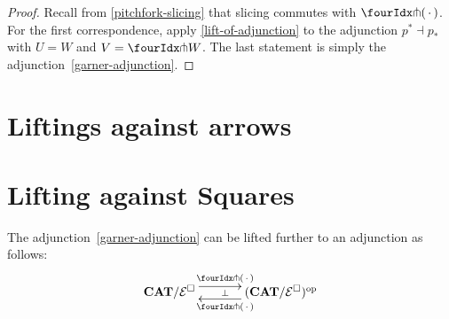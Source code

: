 \documentclass[reqno,10pt,a4paper,oneside]{amsart}
\begin{document}
\begin{proof}
Recall from \cref{pitchfork-slicing} that slicing commutes with $\liftr{\brarghole}$.
For the first correspondence, apply \cref{lift-of-adjunction} to the adjunction $p^* \dashv p_*$ with $U = W$ and $V = \liftr{W}$.
The last statement is simply the adjunction~\eqref{garner-adjunction}.
\end{proof}

\newpage

\appendix

\section{Liftings against arrows} 



\section{Lifting against Squares}


\begin{lemma}
The adjunction~\eqref{garner-adjunction} can be lifted further to an adjunction as follows:
\begin{equation}
\label{garner-adjunction-extended}
\begin{gathered}
\xymatrix@C+1em{
  \CAT/\catE^{\Box}
  \ar@<5pt>[r]^{\liftl{\brarghole}}
  \ar@{}[r]|{\bot}
&
  (\CAT/\catE^{\Box})^{\op}
  \ar@<5pt>[l]^{\liftr{\brarghole}}
}
\end{gathered}
\end{equation}
\end{lemma}
\end{document}
